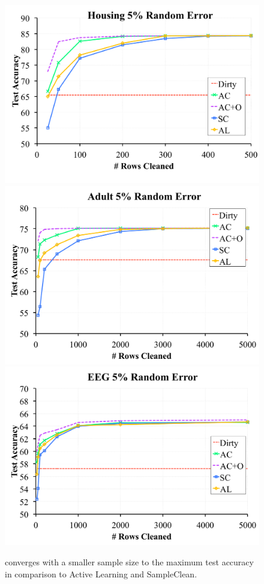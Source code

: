 \begin{figure}[t]
\centering
 \includegraphics[scale=0.15]{exp/exp3aa.pdf}
 \includegraphics[scale=0.15]{exp/exp3bb.pdf}
  \includegraphics[scale=0.15]{exp/exp3cc.pdf}
 \caption{\sys converges with a smaller sample size to the maximum test accuracy in comparison to Active Learning and SampleClean. \label{prio-tperf}}
\end{figure}

